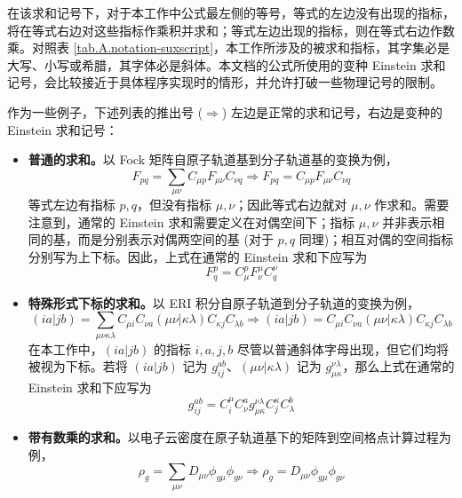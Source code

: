 在该求和记号下，对于本工作中公式最左侧的等号，等式的左边没有出现的指标，将在等式右边对这些指标作乘积并求和；等式左边出现的指标，则在等式右边作数乘。对照表 \ref{tab.A.notation-suxscript}，本工作所涉及的被求和指标，其字集必是大写、小写或希腊，其字体必是斜体。本文档的公式所使用的变种 Einstein 求和记号，会比较接近于具体程序实现时的情形，并允许打破一些物理记号的限制。

作为一些例子，下述列表的推出号 ($\Rightarrow$) 左边是正常的求和记号，右边是变种的 Einstein 求和记号：
\begin{itemize}[nosep]
\item \textbf{普通的求和。}以 Fock 矩阵自原子轨道基到分子轨道基的变换为例，
\begin{equation}
    F_{pq} = \sum_{\mu \nu} C_{\mu p} F_{\mu \nu} C_{\nu q}
    \Rightarrow
    F_{pq} = C_{\mu p} F_{\mu \nu} C_{\nu q}
\end{equation}
等式左边有指标 $p, q$，但没有指标 $\mu, \nu$；因此等式右边就对 $\mu, \nu$ 作求和。需要注意到，通常的 Einstein 求和需要定义在对偶空间下；指标 $\mu, \nu$ 并非表示相同的基，而是分别表示对偶两空间的基 (对于 $p, q$ 同理)；相互对偶的空间指标分别写为上下标。因此，上式在通常的 Einstein 求和下应写为
\begin{equation*}
    F^p_q = C^p_\mu F^\mu_\nu C^\nu_q
\end{equation*}
\item \textbf{特殊形式下标的求和。}以 ERI 积分自原子轨道到分子轨道的变换为例，
\begin{equation}
    (ia|jb) = \sum_{\mu \nu \kappa \lambda} C_{\mu i} C_{\nu a} (\mu \nu | \kappa \lambda) C_{\kappa j} C_{\lambda b}
    \Rightarrow
    (ia|jb) = C_{\mu i} C_{\nu a} (\mu \nu | \kappa \lambda) C_{\kappa j} C_{\lambda b}
\end{equation}
在本工作中，$(ia|jb)$ 的指标 $i, a, j, b$ 尽管以普通斜体字母出现，但它们均将被视为下标。若将 $(ia|jb)$ 记为 $g_{ij}^{ab}$、$(\mu \nu | \kappa \lambda)$ 记为 $g_{\mu \kappa}^{\nu \lambda}$，那么上式在通常的 Einstein 求和下应写为
\begin{equation*}
    g_{ij}^{ab} = C_i^\mu C^a_\nu g_{\mu \kappa}^{\nu \lambda} C_j^\kappa C^b_\lambda
\end{equation*}
\item \textbf{带有数乘的求和。}以电子云密度在原子轨道基下的矩阵到空间格点计算过程为例，
\begin{equation}
    \rho_g = \sum_{\mu \nu} D_{\mu \nu} \phi_{g \mu} \phi_{g \nu}
    \Rightarrow
    \rho_g = D_{\mu \nu} \phi_{g \mu} \phi_{g \nu}
\end{equation}

\end{itemize}
